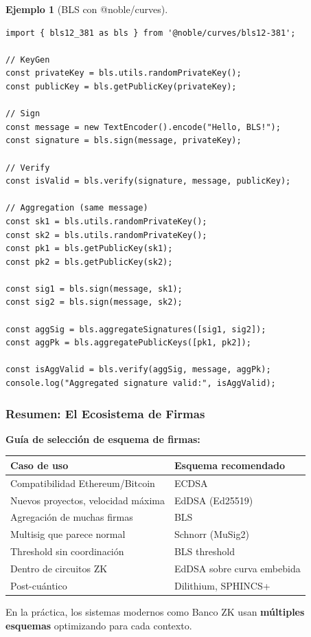 \documentclass[11pt,a4paper,twoside,openright]{book}
\theoremstyle{definition}
\newtheorem{example}{Ejemplo}[chapter]
\theoremstyle{plain}
\theoremstyle{remark}
\begin{document}
\begin{example}[BLS con @noble/curves]
\begin{verbatim}
import { bls12_381 as bls } from '@noble/curves/bls12-381';

// KeyGen
const privateKey = bls.utils.randomPrivateKey();
const publicKey = bls.getPublicKey(privateKey);

// Sign
const message = new TextEncoder().encode("Hello, BLS!");
const signature = bls.sign(message, privateKey);

// Verify
const isValid = bls.verify(signature, message, publicKey);

// Aggregation (same message)
const sk1 = bls.utils.randomPrivateKey();
const sk2 = bls.utils.randomPrivateKey();
const pk1 = bls.getPublicKey(sk1);
const pk2 = bls.getPublicKey(sk2);

const sig1 = bls.sign(message, sk1);
const sig2 = bls.sign(message, sk2);

const aggSig = bls.aggregateSignatures([sig1, sig2]);
const aggPk = bls.aggregatePublicKeys([pk1, pk2]);

const isAggValid = bls.verify(aggSig, message, aggPk);
console.log("Aggregated signature valid:", isAggValid);
\end{verbatim}
\end{example}

\subsubsection{Resumen: El Ecosistema de Firmas}

\begin{keyidea}
\textbf{Guía de selección de esquema de firmas:}

\begin{center}
\begin{tabular}{ll}
\toprule
\textbf{Caso de uso} & \textbf{Esquema recomendado} \\
\midrule
Compatibilidad Ethereum/Bitcoin & ECDSA \\
Nuevos proyectos, velocidad máxima & EdDSA (Ed25519) \\
Agregación de muchas firmas & BLS \\
Multisig que parece normal & Schnorr (MuSig2) \\
Threshold sin coordinación & BLS threshold \\
Dentro de circuitos ZK & EdDSA sobre curva embebida \\
Post-cuántico & Dilithium, SPHINCS+ \\
\bottomrule
\end{tabular}
\end{center}

En la práctica, los sistemas modernos como Banco ZK usan \textbf{múltiples esquemas} optimizando para cada contexto.
\end{keyidea}
\end{document}
